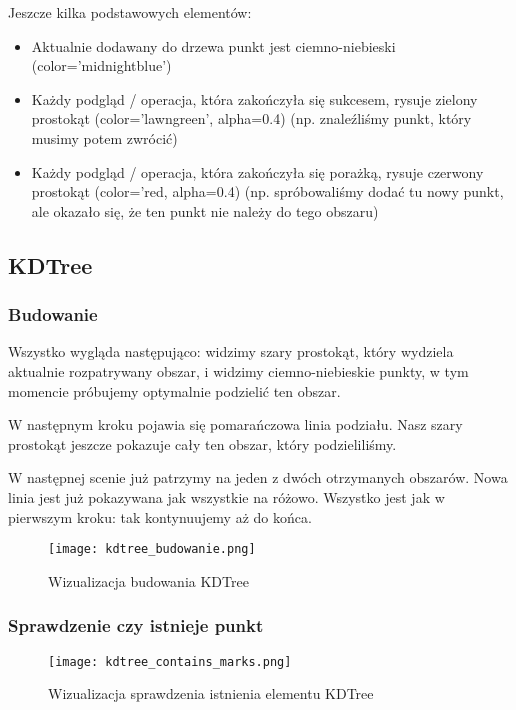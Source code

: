 \documentclass[a4paper, 12pt]{article}
\begin{document}
    \noindent
    \quad Jeszcze kilka podstawowych elementów:

    \begin{itemize}
        \item Aktualnie dodawany do drzewa punkt jest ciemno-niebieski (color='midnightblue')
        \item Każdy podgląd / operacja, która zakończyła się sukcesem, rysuje zielony prostokąt (color='lawngreen', alpha=0.4) (np. znaleźliśmy punkt, który musimy potem zwrócić)
        \item Każdy podgląd / operacja, która zakończyła się porażką, rysuje czerwony prostokąt (color='red, alpha=0.4) (np. spróbowaliśmy dodać tu nowy punkt, ale okazało się, że ten punkt nie należy do tego obszaru)
    \end{itemize}

    \newpage
    \subsection{KDTree}
      \subsubsection{Budowanie}
        \quad Wszystko wygląda następująco: widzimy szary prostokąt, który wydziela aktualnie rozpatrywany obszar, i widzimy ciemno-niebieskie punkty, w tym momencie próbujemy optymalnie podzielić ten obszar.

        \noindent
        \quad W następnym kroku pojawia się pomarańczowa linia podziału. Nasz szary prostokąt jeszcze pokazuje cały ten obszar, który podzieliliśmy.

        \noindent
        \quad W następnej scenie już patrzymy na jeden z dwóch otrzymanych obszarów. Nowa linia jest już pokazywana jak wszystkie na różowo. Wszystko jest jak w pierwszym kroku: tak kontynuujemy aż do końca.

        \begin{figure}[h!]
        \centering
          \texttt{[image: kdtree\_budowanie.png]}
          \caption{Wizualizacja budowania KDTree}
        \end{figure}

      \subsubsection{Sprawdzenie czy istnieje punkt}
        \begin{figure}[h!]
        \centering
          \texttt{[image: kdtree\_contains\_marks.png]}
          \caption{Wizualizacja sprawdzenia istnienia elementu KDTree}
        \end{figure}
\end{document}
